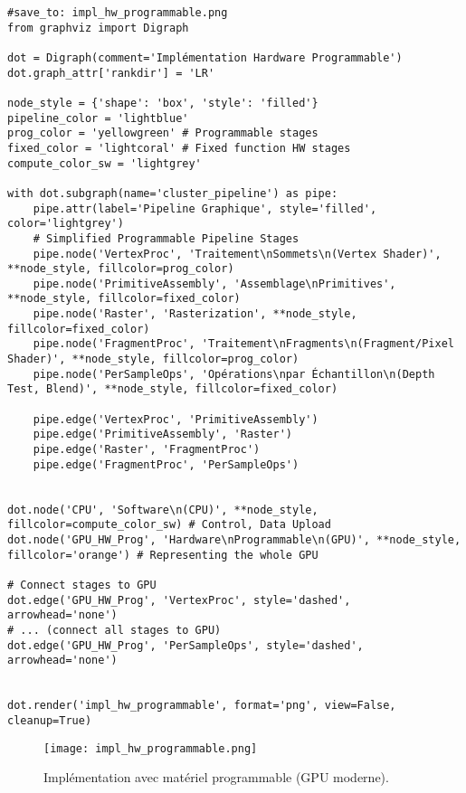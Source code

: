 \documentclass{article}
\begin{document}
\begin{verbatim}
#save_to: impl_hw_programmable.png
from graphviz import Digraph

dot = Digraph(comment='Implémentation Hardware Programmable')
dot.graph_attr['rankdir'] = 'LR'

node_style = {'shape': 'box', 'style': 'filled'}
pipeline_color = 'lightblue'
prog_color = 'yellowgreen' # Programmable stages
fixed_color = 'lightcoral' # Fixed function HW stages
compute_color_sw = 'lightgrey'

with dot.subgraph(name='cluster_pipeline') as pipe:
    pipe.attr(label='Pipeline Graphique', style='filled', color='lightgrey')
    # Simplified Programmable Pipeline Stages
    pipe.node('VertexProc', 'Traitement\nSommets\n(Vertex Shader)', **node_style, fillcolor=prog_color)
    pipe.node('PrimitiveAssembly', 'Assemblage\nPrimitives', **node_style, fillcolor=fixed_color)
    pipe.node('Raster', 'Rasterization', **node_style, fillcolor=fixed_color)
    pipe.node('FragmentProc', 'Traitement\nFragments\n(Fragment/Pixel Shader)', **node_style, fillcolor=prog_color)
    pipe.node('PerSampleOps', 'Opérations\npar Échantillon\n(Depth Test, Blend)', **node_style, fillcolor=fixed_color)

    pipe.edge('VertexProc', 'PrimitiveAssembly')
    pipe.edge('PrimitiveAssembly', 'Raster')
    pipe.edge('Raster', 'FragmentProc')
    pipe.edge('FragmentProc', 'PerSampleOps')


dot.node('CPU', 'Software\n(CPU)', **node_style, fillcolor=compute_color_sw) # Control, Data Upload
dot.node('GPU_HW_Prog', 'Hardware\nProgrammable\n(GPU)', **node_style, fillcolor='orange') # Representing the whole GPU

# Connect stages to GPU
dot.edge('GPU_HW_Prog', 'VertexProc', style='dashed', arrowhead='none')
# ... (connect all stages to GPU)
dot.edge('GPU_HW_Prog', 'PerSampleOps', style='dashed', arrowhead='none')


dot.render('impl_hw_programmable', format='png', view=False, cleanup=True)
\end{verbatim}

\begin{figure}[H]
\centering
\texttt{[image: impl\_hw\_programmable.png]}
\caption{Implémentation avec matériel programmable (GPU moderne).}
\label{fig:impl_hw_programmable}
\end{figure}
\end{document}
